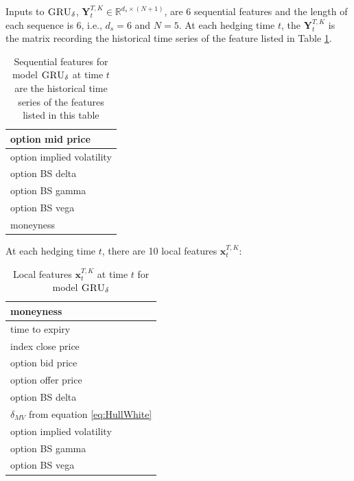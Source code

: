 \documentclass[letterpaper,12pt,titlepage,oneside,final]{book}
\numberwithin{equation}{section}
\theoremstyle{definition}
\newcommand{\model}{\textsc{GRU}_\delta}
\newcommand{\vx}{\mathbf{x}}
\newcommand{\Real}{\mathbb{R}}
\begin{document}
Inputs to $\model$, $\mathbf{Y}_{t}^{T,K} \in \Real^{d_s \times (N+1)}$, are  6  sequential features and the length of each sequence is 6, i.e., $d_s=6$ and $N=5$. At each hedging time $t$, the $\mathbf{Y}_{t}^{T,K}$ is  the matrix recording the historical time series of the feature listed in Table \ref{table:SeqForLocal}.
\begin{table}[htp!]
	\centering
	\begin{tabular}{|l|}
		\hline
		option mid price\\ \hline
		option implied volatility\\ 
		\hline
		option BS delta\\
		\hline
		option BS gamma\\
		\hline
		option BS vega\\
		\hline
		moneyness\\
		\hline
	\end{tabular}
	\label{table:SeqForLocal}
	\caption{Sequential features for model $\model$ at time $t$ are the historical time series of the features listed in this table}
\end{table}
At each hedging time $t$, there are 10 local features  $\vx_{t}^{T,K}$:
\begin{table}[htp!]
	\centering
	\begin{tabular}{|l|}
		\hline
		moneyness \\ \hline
		time to expiry\\ \hline
		index close price\\ \hline
		option bid price\\ \hline
		option offer price\\ \hline
		option BS delta\\ \hline
		$\delta_{MV}$ from equation \eqref{eq:HullWhite} \\ \hline
		option implied volatility\\ \hline
		option BS gamma\\ \hline
		option BS vega\\ \hline
	\end{tabular}
	\caption{Local features  $\vx_{t}^{T,K}$ at time $t$ for model $\model$}
\end{table}
\end{document}
